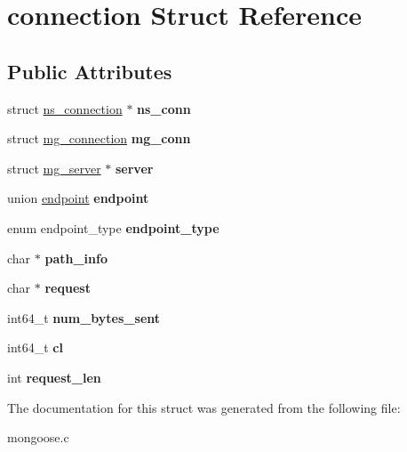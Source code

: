 \hypertarget{structconnection}{\section{connection Struct Reference}
\label{structconnection}
}
\subsection*{Public Attributes}
\begin{DoxyCompactItemize}
\item 
\hypertarget{structconnection_a33338c1069d70a271a5bafa5132698bb}{struct \hyperlink{structns__connection}{ns\-\_\-connection} $\ast$ {\bfseries ns\-\_\-conn}}\label{structconnection_a33338c1069d70a271a5bafa5132698bb}

\item 
\hypertarget{structconnection_acba5c9648d0ccaf436d9f3b1ca4e3663}{struct \hyperlink{structmg__connection}{mg\-\_\-connection} {\bfseries mg\-\_\-conn}}\label{structconnection_acba5c9648d0ccaf436d9f3b1ca4e3663}

\item 
\hypertarget{structconnection_a409f5c2e29f77b3be3fae4f06bc4f1f1}{struct \hyperlink{structmg__server}{mg\-\_\-server} $\ast$ {\bfseries server}}\label{structconnection_a409f5c2e29f77b3be3fae4f06bc4f1f1}

\item 
\hypertarget{structconnection_a61a295c4a3d7f32d0892c8d5b168b761}{union \hyperlink{unionendpoint}{endpoint} {\bfseries endpoint}}\label{structconnection_a61a295c4a3d7f32d0892c8d5b168b761}

\item 
\hypertarget{structconnection_ad5ceb60df6470084af97e10a2a07e9ba}{enum endpoint\-\_\-type {\bfseries endpoint\-\_\-type}}\label{structconnection_ad5ceb60df6470084af97e10a2a07e9ba}

\item 
\hypertarget{structconnection_ad0715458bffff8e5408ae7d16303be02}{char $\ast$ {\bfseries path\-\_\-info}}\label{structconnection_ad0715458bffff8e5408ae7d16303be02}

\item 
\hypertarget{structconnection_aa3be303ab148026058fd456a80040446}{char $\ast$ {\bfseries request}}\label{structconnection_aa3be303ab148026058fd456a80040446}

\item 
\hypertarget{structconnection_ae7bfe72a24ab795993c228c7bd58ace7}{int64\-\_\-t {\bfseries num\-\_\-bytes\-\_\-sent}}\label{structconnection_ae7bfe72a24ab795993c228c7bd58ace7}

\item 
\hypertarget{structconnection_a0831315235b6847023a1bccd1a90b511}{int64\-\_\-t {\bfseries cl}}\label{structconnection_a0831315235b6847023a1bccd1a90b511}

\item 
\hypertarget{structconnection_aaaceaa100948785092d6a1d0522c679b}{int {\bfseries request\-\_\-len}}\label{structconnection_aaaceaa100948785092d6a1d0522c679b}

\end{DoxyCompactItemize}


The documentation for this struct was generated from the following file\-:\begin{DoxyCompactItemize}
\item 
mongoose.\-c\end{DoxyCompactItemize}
